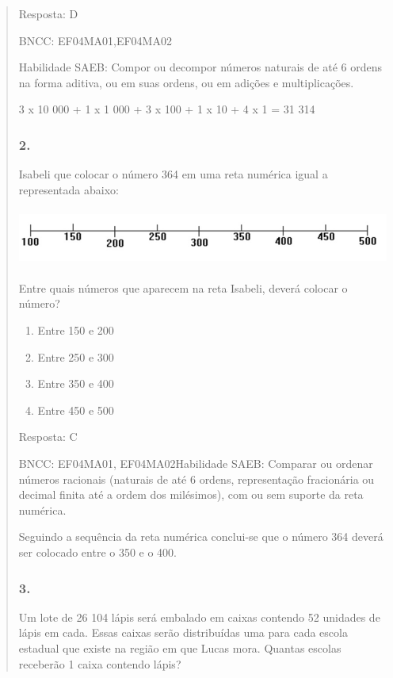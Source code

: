 \begin{enumerate}
\begin{escolha}
\begin{enumerate}
\begin{itemize}
\begin{itemize}
\begin{escolha}
\begin{quote}
\begin{escolha}
{Resposta: D

BNCC: EF04MA01,EF04MA02

Habilidade SAEB: Compor ou decompor números naturais de até 6 ordens na
forma aditiva, ou em suas ordens, ou em adições e multiplicações.

3 x 10 000 + 1 x 1 000 + 3 x 100 + 1 x 10 + 4 x 1 = 31 314

\subsubsection{2.}\label{section-158}

Isabeli que colocar o número 364 em uma reta numérica igual a
representada abaixo:

\includegraphics[width=5.90556in,height=0.74931in]{media/image153.png}

Entre quais números que aparecem na reta Isabeli, deverá colocar o
número?

\begin{enumerate}
\def\labelenumi{\alph{enumi})}
\item
  Entre 150 e 200
\item
  Entre 250 e 300
\item
  Entre 350 e 400
\item
  Entre 450 e 500
\end{enumerate}

Resposta: C

BNCC: EF04MA01, EF04MA02Habilidade SAEB: Comparar ou ordenar números
racionais (naturais de até 6 ordens, representação fracionária ou
decimal finita até a ordem dos milésimos), com ou sem suporte da reta
numérica.

Seguindo a sequência da reta numérica conclui-se que o número 364 deverá
ser colocado entre o 350 e o 400.

\subsubsection{3.}\label{section-159}

Um lote de 26 104 lápis será embalado em caixas contendo 52 unidades de
lápis em cada. Essas caixas serão distribuídas uma para cada escola
estadual que existe na região em que Lucas mora. Quantas escolas
receberão 1 caixa contendo lápis?

}
\end{escolha}
\end{quote}
\end{escolha}
\end{itemize}
\end{itemize}
\end{enumerate}
\end{escolha}
\end{enumerate}
